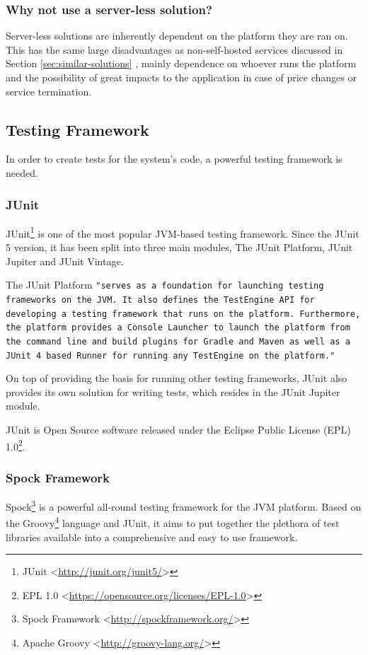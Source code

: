 \subsubsection*{Why not use a server-less solution?}
Server-less solutions are inherently dependent on the platform they are ran on. This has the same large disadvantages as non-self-hosted services discussed in Section \ref{sec:similar-solutions} , mainly dependence on whoever runs the platform and the possibility of great impacts to the application in case of price changes or service termination.

\subsection{Testing Framework}
In order to create tests for the system's code, a powerful testing framework is needed.
\subsubsection{JUnit}
JUnit\footnote{JUnit <\url{http://junit.org/junit5/}>} is one of the most popular JVM-based testing framework. Since the JUnit 5 version, it has been split into three main modules, The JUnit Platform, JUnit Jupiter and JUnit Vintage.

The JUnit Platform \texttt{"serves as a foundation for launching testing frameworks on the JVM. It also defines the TestEngine API for developing a testing framework that runs on the platform. Furthermore, the platform provides a Console Launcher to launch the platform from the command line and build plugins for Gradle and Maven as well as a JUnit 4 based Runner for running any TestEngine on the platform."}\cite{junit}

On top of providing the basis for running other testing frameworks, JUnit also provides its own solution for writing tests, which resides in the JUnit Jupiter module.

JUnit is Open Source software released under the Eclipse Public License (EPL) 1.0\footnote{EPL 1.0 <\url{https://opensource.org/licenses/EPL-1.0}>}.

\subsubsection{Spock Framework}
Spock\footnote{Spock Framework <\url{http://spockframework.org/}>} is a powerful all-round testing framework for the JVM platform. Based on the Groovy\footnote{Apache Groovy <\url{http://groovy-lang.org/}>} language and JUnit, it aims to put together the plethora of test libraries available into a comprehensive and easy to use framework. 

